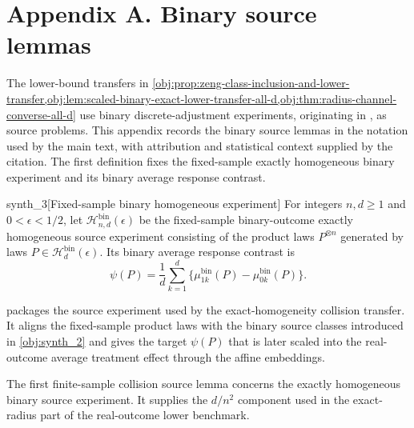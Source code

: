\section{Appendix A. Binary source lemmas}

The lower-bound transfers in \cref{obj:prop:zeng-class-inclusion-and-lower-transfer,obj:lem:scaled-binary-exact-lower-transfer-all-d,obj:thm:radius-channel-converse-all-d} use binary discrete-adjustment experiments, originating in \citet{ZengBalakrishnanHanKennedy2024}, as source problems. This appendix records the binary source lemmas in the notation used by the main text, with attribution and statistical context supplied by the citation. The first definition fixes the fixed-sample exactly homogeneous binary experiment and its binary average response contrast.

\begin{definitionv}{synth_3}[Fixed-sample binary homogeneous experiment]
For integers \(n,d\ge1\) and \(0<\epsilon<1/2\), let \(\mathcal H_{n,d}^{\mathrm{bin}}(\epsilon)\) be the fixed-sample binary-outcome exactly homogeneous source experiment consisting of the product laws \(P^{\otimes n}\) generated by laws \(P\in\mathcal H_d^{\mathrm{bin}}(\epsilon)\). Its binary average response contrast is
\[
\psi(P)=\frac1d\sum_{k=1}^d\{\mu_{1k}^{\mathrm{bin}}(P)-\mu_{0k}^{\mathrm{bin}}(P)\}.
\]
\end{definitionv}

 packages the source experiment used by the exact-homogeneity collision transfer. It aligns the fixed-sample product laws with the binary source classes introduced in \cref{obj:synth_2} and gives the target \(\psi(P)\) that is later scaled into the real-outcome average treatment effect through the affine embeddings.

The first finite-sample collision source lemma concerns the exactly homogeneous binary source experiment. It supplies the \(d/n^2\) component used in the exact-radius part of the real-outcome lower benchmark.

